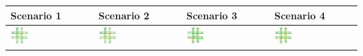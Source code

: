 \begin{table}[b]
	\centering
	\renewcommand{\arraystretch}{1.3}
	\begin{tabularx}{\textwidth}{|Y|Y|Y|Y|}
		\hline
		
		\textbf{Scenario} 1 & \textbf{Scenario 2} & \textbf{Scenario 3} & \textbf{Scenario 4} \\
		
		\hline
		
		\includegraphics[width=0.23\textwidth]{../gfx/data/E1_003.png} &
		\includegraphics[width=0.23\textwidth]{../gfx/data/E2_003.png} &
		\includegraphics[width=0.23\textwidth]{../gfx/data/E3_003.png} &
		\includegraphics[width=0.23\textwidth]{../gfx/data/E4_003.png} \\
		
		\hline
		

\end{tabularx}
\end{table}
